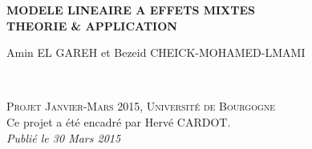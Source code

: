 \documentclass[12pt,fleqn]{book} %
\begin{document}
\let\cleardoublepage\clearpage


\begingroup
\thispagestyle{empty}
\centering
\vspace*{5cm}
\par\normalfont\fontsize{35}{35}\sffamily\selectfont
\textbf{MODELE LINEAIRE A EFFETS MIXTES\\ THEORIE \& APPLICATION }\\
{\LARGE }\par %
\vspace*{1cm}
{\Huge Amin EL GAREH et Bezeid CHEICK-MOHAMED-LMAMI}\par %
\endgroup


\newpage
~\vfill
\thispagestyle{empty}


\noindent \textsc{Projet Janvier-Mars 2015, Université de Bourgogne}\\

\noindent Ce projet a été encadré par Hervé CARDOT.\\ %

\noindent \textit{Publié le 30 Mars 2015} %



\pagestyle{empty} %

\renewcommand\contentsname{Table des Matières}
\renewcommand{\bibname}{Bibliographie}
\tableofcontents%

\end{document}
